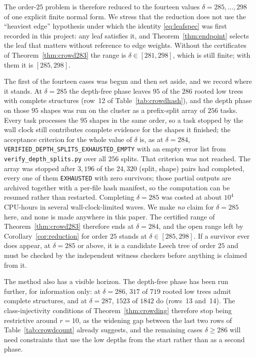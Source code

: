 \documentclass[11pt,a4paper]{article}
\theoremstyle{plain}
\theoremstyle{remark}
\newcommand{\file}[1]{\texttt{#1}}
\newcommand{\tok}[1]{\texttt{#1}}
\newcommand{\bk}{\discretionary{}{}{}}
\begin{document}
The order-$25$ problem is therefore reduced to the fourteen values
$\delta=285,\dots,298$ of one explicit finite normal form.  We stress that the
reduction does not use the ``heaviest edge'' hypothesis under which the
identity \eqref{eq:leafspec} was first recorded in this project: any leaf
satisfies it, and Theorem~\ref{thm:endpoint} selects the leaf that matters
without reference to edge weights.  Without the certificates of
Theorem~\ref{thm:crowd283} the range is $\delta\in[281,298]$, which is still
finite; with them it is $[285,298]$.

The first of the fourteen cases was begun and then set aside, and we record
where it stands.  At $\delta=285$ the depth-free phase leaves $95$ of the $286$
rooted low trees with complete structures (row~12 of
Table~\ref{tab:crowdhash}), and the depth phase on those $95$ shapes was run on
the cluster as a prefix-split array of $256$ tasks.  Every task processes the
$95$ shapes in the same order, so a task stopped by the wall clock still
contributes complete evidence for the shapes it finished; the acceptance
criterion for the whole value of $\delta$ is, as at $\delta=284$,
\tok{VERIFIED\_\bk DEPTH\_\bk SPLITS\_\bk EXHAUSTED\_\bk EMPTY} with an empty
error list from \file{verify\_depth\_splits.py} over all $256$ splits.  That
criterion was not reached.  The array was stopped after $3{,}196$ of the
$24{,}320$ (split, shape) pairs had completed, every one of them
\tok{EXHAUSTED} with zero survivors; those partial outputs are archived
together with a per-file hash manifest, so the computation can be resumed
rather than restarted.  Completing $\delta=285$ was costed at about
$10^4$ CPU-hours in several wall-clock-limited waves.  We make \emph{no} claim
for $\delta=285$ here, and none is made anywhere in this paper.  The certified range of
Theorem~\ref{thm:crowd283} therefore ends at $\delta=284$, and the open range
left by Corollary~\ref{cor:reduction} for order $25$ stands at
$\delta\in[285,298]$.  If a survivor ever does appear, at $\delta=285$ or
above, it is a candidate Leech tree of order $25$ and must be checked by the
independent witness checkers before anything is claimed from it.

The method also has a visible horizon.  The depth-free phase has been run
further, for information only: at $\delta=286$, $317$ of $719$ rooted low trees
admit complete structures, and at $\delta=287$, $1523$ of $1842$ do
(rows~13 and~14).  The
class-injectivity conditions of Theorem~\ref{thm:crowding} therefore stop being
restrictive around $r=10$, as the widening gap between the last two rows of
Table~\ref{tab:crowdcount} already suggests, and the
remaining cases $\delta\ge286$ will need constraints that use the low depths
from the start rather than as a second phase.
\end{document}
